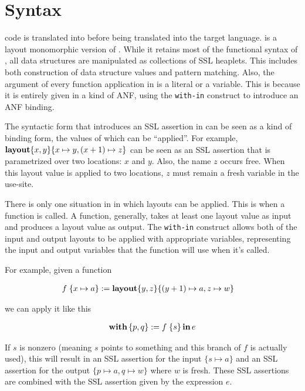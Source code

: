 \section{Syntax}

\Pika{} code is translated into \PikaCore{} before being translated into the target language. \PikaCore{}
is a layout monomorphic version of \Pika{}. While it retains most of the functional syntax of \Pika,
all data structures are manipulated as collections of SSL heaplets. This includes both construction
of data structure values and pattern matching. Also, the argument of every function application in
\PikaCore{} is a literal or a variable. This is because it is entirely given in a kind of ANF, using
the \verb|with-in| construct to introduce an ANF binding.

The syntactic form that introduces an SSL assertion in \PikaCore{} can be seen as a kind of binding
form, the values of which can be ``applied''. For example, $\textbf{layout}\{ x, y \}\{ x \mapsto y, (x+1) \mapsto z \}$
can be seen as an SSL assertion that is parametrized over two locations: $x$ and $y$. Also, the name
$z$ occurs free. When this layout value is applied to two locations, $z$ must remain a fresh variable in
the use-site.

There is only one situation in \PikaCore{} in which layouts can be applied. This is when a function
is called. A function, generally, takes at least one layout value as input and produces a layout value as
output. The \verb|with-in| construct allows both of the input and output layouts to be applied with
appropriate variables, representing the input and output variables that the function will use when
it's called.

For example, given a function

\begin{align*}
  &f\; \{ x \mapsto a \} := \textbf{layout}\{ y, z \}\{ (y+1) \mapsto a, z \mapsto w \}
\end{align*}

\noindent
we can apply it like this

\begin{align*}
  \textbf{with}\,\{p, q\} := f\; \{s\}\,\textbf{in}\, e
\end{align*}

\noindent
If $s$ is nonzero (meaning $s$ points to something and this branch of $f$ is actually used), this will result in an SSL assertion
for the input $\{s \mapsto a\}$ and an SSL assertion for the output $\{p \mapsto a, q \mapsto w\}$ where $w$ is fresh. These
SSL assertions are combined with the SSL assertion given by the expression $e$.

